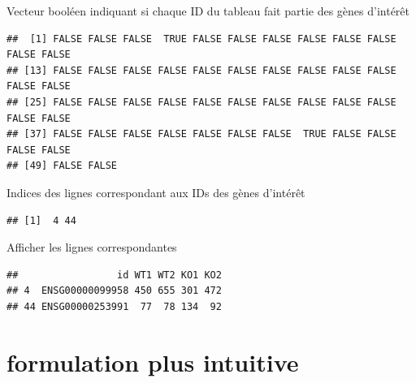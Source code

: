 \documentclass[
]{book}
\newenvironment{Shaded}{\begin{snugshade}}{\end{snugshade}}
\newcommand{\FunctionTok}[1]{\textcolor[rgb]{0.00,0.00,0.00}{#1}}
\newcommand{\NormalTok}[1]{#1}
\newcommand{\SpecialCharTok}[1]{\textcolor[rgb]{0.00,0.00,0.00}{#1}}
\begin{document}
Vecteur booléen indiquant si chaque ID du tableau fait partie des gènes d'intérêt

\begin{Shaded}
\end{Shaded}

\begin{verbatim}
##  [1] FALSE FALSE FALSE  TRUE FALSE FALSE FALSE FALSE FALSE FALSE FALSE FALSE
## [13] FALSE FALSE FALSE FALSE FALSE FALSE FALSE FALSE FALSE FALSE FALSE FALSE
## [25] FALSE FALSE FALSE FALSE FALSE FALSE FALSE FALSE FALSE FALSE FALSE FALSE
## [37] FALSE FALSE FALSE FALSE FALSE FALSE FALSE  TRUE FALSE FALSE FALSE FALSE
## [49] FALSE FALSE
\end{verbatim}

Indices des lignes correspondant aux IDs des gènes d'intérêt

\begin{Shaded}
\end{Shaded}

\begin{verbatim}
## [1]  4 44
\end{verbatim}

Afficher les lignes correspondantes

\begin{Shaded}
\end{Shaded}

\begin{verbatim}
##                 id WT1 WT2 KO1 KO2
## 4  ENSG00000099958 450 655 301 472
## 44 ENSG00000253991  77  78 134  92
\end{verbatim}

\hypertarget{formulation-plus-intuitive}{%
\section{formulation plus intuitive}\label{formulation-plus-intuitive}}
\end{document}
